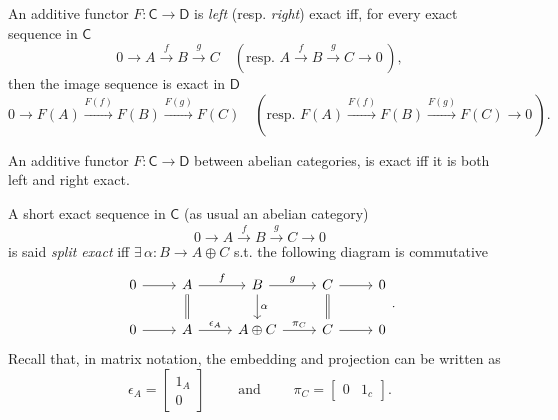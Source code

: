 \begin{defn}
	An additive functor $F\colon \mathsf{C} \to \mathsf{D}$ is {\em left} (resp. {\em right}) exact iff,
	for every exact sequence in $\mathsf{C}$
	\begin{equation}
		0 \to A \xrightarrow{f} B \xrightarrow{g} C \quad ( \text{resp. }
		A \xrightarrow{f} B \xrightarrow{g} C \to 0\, )
	,\end{equation} 
	then the image sequence is exact in $\mathsf{D}$ 
	\begin{equation}
		0 \to F(A) \xrightarrow{F(f)} F(B) \xrightarrow{F(g)} F(C) \quad ( \text{resp. }
		F(A) \xrightarrow{F(f)} F(B) \xrightarrow{F(g)} F(C) \to 0\, )
	.\end{equation} 
\end{defn}

\begin{prop}
	An additive functor $F\colon \mathsf{C} \to \mathsf{D}$ between abelian categories,
	is exact iff it is both left and right exact.
\end{prop} 

\begin{defn}
	A short exact sequence in $\mathsf{C}$ (as usual an abelian category)
	\begin{equation}
	0 \to A \xrightarrow{f} B \xrightarrow{g} C \to 0 
	\end{equation} 
	is said {\em split exact} iff $\exists\, \alpha\colon B \to A \oplus C$ s.t. the following diagram is commutative
	\begin{equation}
	\begin{tikzcd}
		0 \arrow[r, "", rightarrow] &
		A \arrow[r, "f", rightarrow] \arrow[d, "", equal] &
		B \arrow[r, "g", rightarrow] \arrow[d, "\alpha", rightarrow] &
		C \arrow[r, "", rightarrow] \arrow[d, "", equal] &
		0\\
		0 \arrow[r, "", rightarrow] &
		A \arrow[r, "\epsilon_A", rightarrow] &
		A \oplus C \arrow[r, "\pi_C", rightarrow] &
		C \arrow[r, "", rightarrow] &
		0
	\end{tikzcd}
	.\end{equation} 
	Recall that, in matrix notation, the embedding and projection can be written as
	 \begin{equation}
	\epsilon_A = 
	\begin{bmatrix}
		1_A\\ 0
	\end{bmatrix} \qquad \text{ and } \qquad
	\pi_C = 
	\begin{bmatrix}
		0 & 1_c
	\end{bmatrix} 
	.\end{equation} 
\end{defn}

